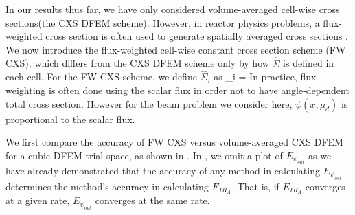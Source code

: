 In our results thus far, we have only considered volume-averaged cell-wise cross sections(the CXS DFEM scheme).
However, in reactor physics problems, a flux-weighted cross section is often used to generate spatially averaged cross sections \cite{bell_glasstone}.
We now introduce the flux-weighted cell-wise constant cross section scheme (FW CXS), which differs from the CXS DFEM scheme only by how $\hat{\Sigma}$ is defined in each cell.  
For the FW CXS scheme, we define $\hat{\Sigma}_i$ as
\benum
\hat{\Sigma}_i =  \pep
\label{eq:chap3_fw_cxs}
\eenum
In practice, flux-weighting is often done using the scalar flux in order not to have angle-dependent total cross section.  
However for the beam problem we consider here, $\psi(x,\mu_d)$ is proportional to the scalar flux.

We first compare the accuracy of FW CXS versus  volume-averaged CXS DFEM for a cubic DFEM trial space, as shown in .  
In , we omit a plot of $E_{\psi_{out}}$ as we have already demonstrated that the accuracy of any method in calculating $E_{\psi_{out}}$ determines the method's accuracy in calculating $E_{IR_A}$.  
That is, if $E_{IR_A}$ converges at a given rate, $E_{\psi_{out}}$ converges at the same rate.  

